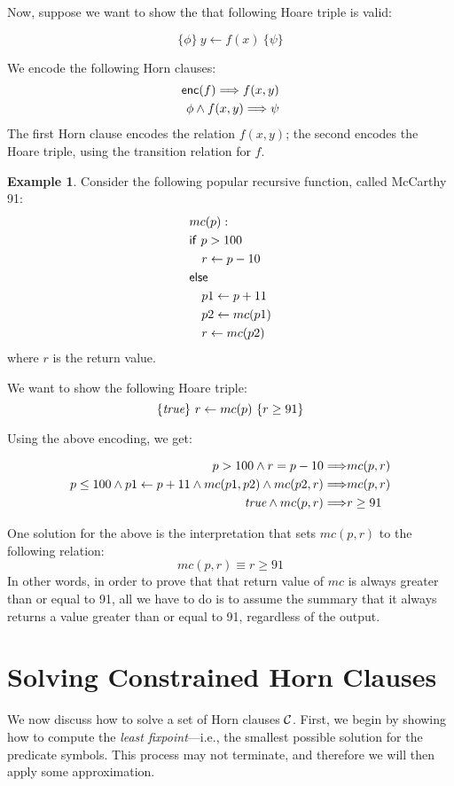 \documentclass{amsart}
\theoremstyle{definition}
\newtheorem{example}[theorem]{Example}
\theoremstyle{remark}
\numberwithin{equation}{section}
\begin{document}
Now, suppose we want to show the that following
Hoare triple is valid:

$$ \{ \phi \} \ y \gets f(x) \ \{ \psi \}$$

We encode the following Horn clauses:
\begin{align*}
\mathsf{enc}(f) \Longrightarrow f(x,y)  \\
\phi \land f(x,y) \Longrightarrow \psi
\end{align*}
The first Horn clause encodes the relation $f(x,y)$;
the second encodes the Hoare triple, using the transition relation for
$f$.

\begin{example}
Consider the following popular recursive function, called McCarthy 91:
\begin{align*}
& mc(p):\\
& \mathsf{if}\ p > 100\\
& \ \ \ r \gets p - 10\\
& \mathsf{else}\\
& \ \ \ p1 \gets p + 11\\
& \ \ \ p2 \gets mc(p1)\\
& \ \ \ r \gets mc(p2)
\end{align*}
where $r$ is the return value.

We want to show the following Hoare triple:
$$\{\emph{true}\} \ r \gets mc(p) \ \{r \geq 91\}$$

Using the above encoding, we get:

\begin{align*}
p > 100 \land r = p - 10 \Longrightarrow& mc(p,r)\\
p \leq 100 \land p1 \gets p + 11 \land mc(p1,p2) \land mc(p2,r) \Longrightarrow& mc(p,r)\\
\emph{true} \land mc(p,r) \Longrightarrow& r \geq 91
\end{align*}

One solution for the above is the interpretation that
sets $mc(p,r)$ to the following relation:
$$ mc(p,r) \equiv r \geq 91$$
In other words, in order to prove that that return value of
$mc$ is always greater than or equal to 91, all we have to do
is to assume the summary that it always returns a value greater than
or equal to 91, regardless of the output.

\end{example}

\section{Solving Constrained Horn Clauses}
We now discuss how to solve a set of Horn clauses $\mathcal{C}$.
First, we begin by showing how to compute the \emph{least fixpoint}---i.e., the smallest possible solution for the predicate symbols.
This process may not terminate, and therefore we will then apply some approximation.
\end{document}
